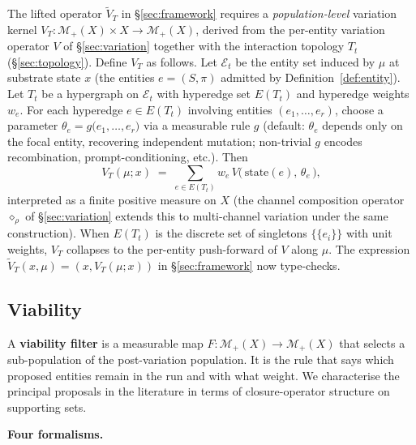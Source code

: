 \documentclass[journal]{IEEEtran}
\theoremstyle{plain}
\theoremstyle{definition}
\theoremstyle{plain}
\newcounter{topic}[subsection]
\newcommand{\topic}[1]{%
  \refstepcounter{topic}%
  \par\smallskip\noindent\textbf{#1.}\ }
\newcommand{\Mplus}{\mathcal{M}_{+}}
\begin{document}
The lifted operator $\widetilde V_T$ in \S\ref{sec:framework} requires a
\emph{population-level} variation kernel
$V_T : \Mplus(X) \times X \to \Mplus(X)$, derived from the per-entity
variation operator $V$ of \S\ref{sec:variation} together with the
interaction topology $T_t$ (\S\ref{sec:topology}). Define $V_T$ as follows.
Let $\mathcal{E}_t$ be the entity set induced by $\mu$ at substrate state
$x$ (the entities $e=(S,\pi)$ admitted by Definition~\ref{def:entity}). Let
$T_t$ be a hypergraph on $\mathcal{E}_t$ with hyperedge set $E(T_t)$ and
hyperedge weights $w_e$. For each hyperedge $e \in E(T_t)$ involving
entities $(e_1,\dots,e_r)$, choose a parameter
$\theta_e = g\!\big(e_1,\dots,e_r\big)$ via a measurable rule $g$ (default:
$\theta_e$ depends only on the focal entity, recovering independent
mutation; non-trivial $g$ encodes recombination, prompt-conditioning, etc.).
Then
\[
  V_T(\mu;x) \;=\; \sum_{e \in E(T_t)} w_e \,
                   V\!\big(\,\mathrm{state}(e),\, \theta_e\,\big),
\]
interpreted as a finite positive measure on $X$ (the channel composition
operator $\diamond_\rho$ of \S\ref{sec:variation} extends this to
multi-channel variation under the same construction). When $E(T_t)$ is the
discrete set of singletons $\{\{e_i\}\}$ with unit weights, $V_T$ collapses
to the per-entity push-forward of $V$ along $\mu$. The expression
$\widetilde V_T(x,\mu) = (x, V_T(\mu;x))$ in \S\ref{sec:framework} now
type-checks.

\subsection{Viability}\label{sec:viability}

A \textbf{viability filter} is a measurable map
$F : \Mplus(X) \to \Mplus(X)$ that selects a sub-population of the
post-variation population. It is the rule that says which proposed entities
remain in the run and with what weight. We characterise the principal
proposals in the literature in terms of closure-operator structure on
supporting sets.

\topic{Four formalisms}
\end{document}
